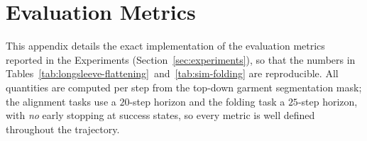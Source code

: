\documentclass[journal]{IEEEtran}
\begin{document}
\section{Evaluation Metrics} \label{app:eval_protocol}

This appendix details the exact implementation of the evaluation metrics reported in the Experiments
(Section~\ref{sec:experiments}), so that the numbers in
Tables~\ref{tab:longsleeve-flattening}~and~\ref{tab:sim-folding} are reproducible. All quantities are
computed per step from the top-down garment segmentation mask; the alignment tasks use a $20$-step
horizon and the folding task a $25$-step horizon, with \emph{no} early stopping at success states, so
every metric is well defined throughout the trajectory.

\begin{table}[t!]
\caption{Numerical comparison of learning-based multi-primitive dual-arm methods for Canonical Flattening in simulation across 5/10/15/20-step horizons.}
\label{tab:longsleeve-flattening}
\centering
{}
\end{table}
\end{document}
